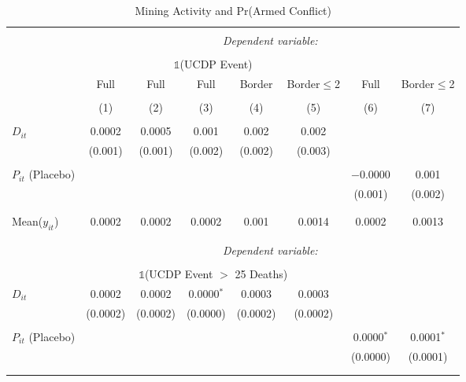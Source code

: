 \begin{table}[ht!] \centering 
  \caption{Mining Activity and Pr(Armed Conflict)} 
  \label{tab:did_ucdp} 
\begin{tabular}{@{\extracolsep{0pt}}lccccccc} 
\\[-1.8ex]\hline 
\hline \\[-1.8ex] 
 & \multicolumn{7}{c}{\textit{Dependent variable:}} \\ 
\cline{2-8} 
\\[-1.8ex] & \multicolumn{5}{c}{$\mathbb{1}$(UCDP Event)} & \multicolumn{2}{c}{} \\ 
 & Full & Full & Full & Border & Border$\leq$2 & Full & Border$\leq$2 \\ 
\\[-1.8ex] & (1) & (2) & (3) & (4) & (5) & (6) & (7)\\ 
\hline \\[-1.8ex] 
 $D_{it}$ & 0.0002 & 0.0005 & 0.001 & 0.002 & 0.002 &  &  \\ 
  & (0.001) & (0.001) & (0.002) & (0.002) & (0.003) &  &  \\ 
  & & & & & & & \\ 
 $P_{it}$ (Placebo) &  &  &  &  &  & $-$0.0000 & 0.001 \\ 
  &  &  &  &  &  & (0.001) & (0.002) \\ 
  & & & & & & & \\ 
\hline \\[-1.8ex] 
Mean($y_{it}$) & 0.0002 & 0.0002 & 0.0002 & 0.001 & 0.0014 & 0.0002 & 0.0013 \\ 
\\[-1.8ex]\hline \hline \\[-1.8ex]
 & \multicolumn{7}{c}{\textit{Dependent variable:}} \\ 
\cline{2-8} 
\\[-1.8ex] & \multicolumn{5}{c}{$\mathbb{1}$(UCDP Event $>$ 25 Deaths)} & \multicolumn{2}{c}{} \\ 
 $D_{it}$ & 0.0002 & 0.0002 & 0.0000$^{*}$ & 0.0003 & 0.0003 &  &  \\ 
  & (0.0002) & (0.0002) & (0.0000) & (0.0002) & (0.0002) &  &  \\ 
  & & & & & & & \\ 
 $P_{it}$ (Placebo) &  &  &  &  &  & 0.0000$^{*}$ & 0.0001$^{*}$ \\ 
  &  &  &  &  &  & (0.0000) & (0.0001) \\ 
  & & & & & & & \\ 
\hline \\[-1.8ex] 

\end{tabular}
\end{table}
